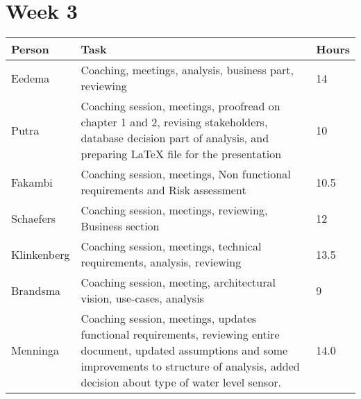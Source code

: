 \section{Week 3}
\begin{tabular}{p{} p{} p{}}
	\textbf{Person} & \textbf{Task}                                                                                                                                                                                                & \textbf{Hours} \\ \midrule
	Eedema          & Coaching, meetings, analysis, business part, reviewing                                                                                                                                                       & 14             \\ \midrule
	Putra           & Coaching session, meetings, proofread on chapter 1 and 2, revising stakeholders, database decision part of analysis, and preparing \LaTeX{} file for the presentation                                        & 10             \\ \midrule
	Fakambi         & Coaching session, meetings, Non functional requirements and Risk assessment                                                                                                                                  & 10.5           \\ \midrule
	Schaefers       & Coaching session, meetings, reviewing, Business section                                                                                                                                                      & 12             \\ \midrule
	Klinkenberg     & Coaching session, meetings, technical requirements, analysis, reviewing                                                                                                                                      & 13.5           \\ \midrule
	Brandsma        & Coaching session, meeting, architectural vision, use-cases, analysis                                                                                                                                         & 9              \\ \midrule
	Menninga        & Coaching session, meetings, updates functional requirements, reviewing entire document, updated assumptions and some improvements to structure of analysis, added decision about type of water level sensor. & 14.0           \\ \midrule
\end{tabular}

